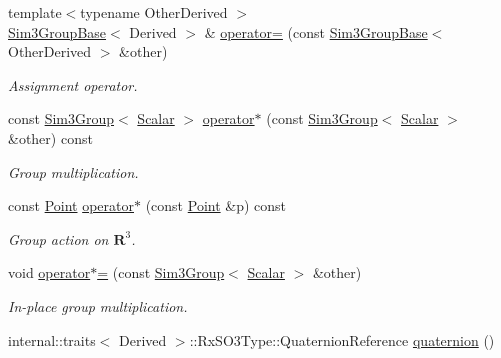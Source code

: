 \begin{DoxyCompactItemize}
\item 
{\footnotesize template$<$typename Other\+Derived $>$ }\\\hyperlink{class_sophus_1_1_sim3_group_base}{Sim3\+Group\+Base}$<$ Derived $>$ \& \hyperlink{class_sophus_1_1_sim3_group_base_a05c83b534686d7e048307ca962c3d3b3}{operator=} (const \hyperlink{class_sophus_1_1_sim3_group_base}{Sim3\+Group\+Base}$<$ Other\+Derived $>$ \&other)\hypertarget{class_sophus_1_1_sim3_group_base_a05c83b534686d7e048307ca962c3d3b3}{}\label{class_sophus_1_1_sim3_group_base_a05c83b534686d7e048307ca962c3d3b3}

\begin{DoxyCompactList}\small\item\em Assignment operator. \end{DoxyCompactList}\item 
const \hyperlink{class_sophus_1_1_sim3_group}{Sim3\+Group}$<$ \hyperlink{class_sophus_1_1_sim3_group_base_abcf3d57b9fcc425bbc367a85a45a8092}{Scalar} $>$ \hyperlink{class_sophus_1_1_sim3_group_base_a2870e3d6011b9a8a9b89b9ad21a2c00f}{operator$\ast$} (const \hyperlink{class_sophus_1_1_sim3_group}{Sim3\+Group}$<$ \hyperlink{class_sophus_1_1_sim3_group_base_abcf3d57b9fcc425bbc367a85a45a8092}{Scalar} $>$ \&other) const 
\begin{DoxyCompactList}\small\item\em Group multiplication. \end{DoxyCompactList}\item 
const \hyperlink{class_sophus_1_1_sim3_group_base_a4b50c6b94e402746e50076305781dc9d}{Point} \hyperlink{class_sophus_1_1_sim3_group_base_a39e689b5b3709c2fbfeda9a4485fc173}{operator$\ast$} (const \hyperlink{class_sophus_1_1_sim3_group_base_a4b50c6b94e402746e50076305781dc9d}{Point} \&p) const 
\begin{DoxyCompactList}\small\item\em Group action on $ \mathbf{R}^3 $. \end{DoxyCompactList}\item 
void \hyperlink{class_sophus_1_1_sim3_group_base_abd2cea80fd7e2216e1ca9f1fa8681b67}{operator$\ast$=} (const \hyperlink{class_sophus_1_1_sim3_group}{Sim3\+Group}$<$ \hyperlink{class_sophus_1_1_sim3_group_base_abcf3d57b9fcc425bbc367a85a45a8092}{Scalar} $>$ \&other)
\begin{DoxyCompactList}\small\item\em In-\/place group multiplication. \end{DoxyCompactList}\item 
internal\+::traits$<$ Derived $>$\+::Rx\+S\+O3\+Type\+::\+Quaternion\+Reference \hyperlink{class_sophus_1_1_sim3_group_base_a3629f9f036df49823d478e3692d23e82}{quaternion} ()\hypertarget{class_sophus_1_1_sim3_group_base_a3629f9f036df49823d478e3692d23e82}{}\label{class_sophus_1_1_sim3_group_base_a3629f9f036df49823d478e3692d23e82}


\end{DoxyCompactItemize}

